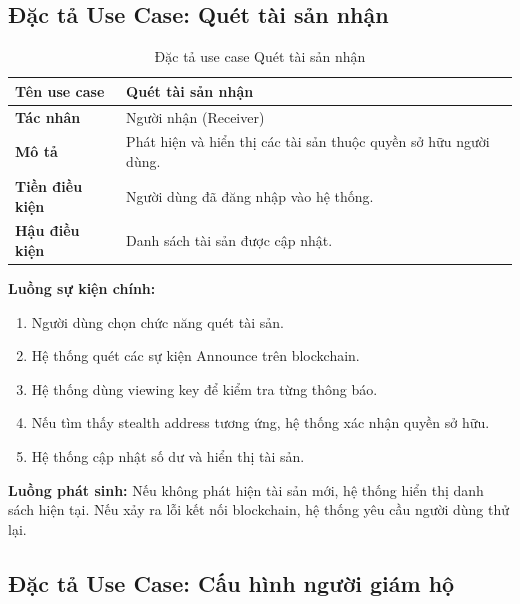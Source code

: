 \documentclass[../DoAn.tex]{subfiles}
\begin{document}

\subsection{Đặc tả Use Case: Quét tài sản nhận}

\begin{table}[H]
\centering
\caption{Đặc tả use case Quét tài sản nhận}
\begin{tabular}{|p{4cm}|p{10cm}|}
\hline
\textbf{Tên use case} & Quét tài sản nhận \\ \hline
\textbf{Tác nhân} & Người nhận (Receiver) \\ \hline
\textbf{Mô tả} & Phát hiện và hiển thị các tài sản thuộc quyền sở hữu người dùng. \\ \hline
\textbf{Tiền điều kiện} & Người dùng đã đăng nhập vào hệ thống. \\ \hline
\textbf{Hậu điều kiện} & Danh sách tài sản được cập nhật. \\ \hline
\end{tabular}
\end{table}

\textbf{Luồng sự kiện chính:}

\begin{enumerate}
    \item Người dùng chọn chức năng quét tài sản.
    \item Hệ thống quét các sự kiện Announce trên blockchain.
    \item Hệ thống dùng viewing key để kiểm tra từng thông báo.
    \item Nếu tìm thấy stealth address tương ứng, hệ thống xác nhận quyền sở hữu.
    \item Hệ thống cập nhật số dư và hiển thị tài sản.
\end{enumerate}

\textbf{Luồng phát sinh:} Nếu không phát hiện tài sản mới, hệ thống hiển thị danh sách hiện tại. Nếu xảy ra lỗi kết nối blockchain, hệ thống yêu cầu người dùng thử lại.


\subsection{Đặc tả Use Case: Cấu hình người giám hộ}
\end{document}
